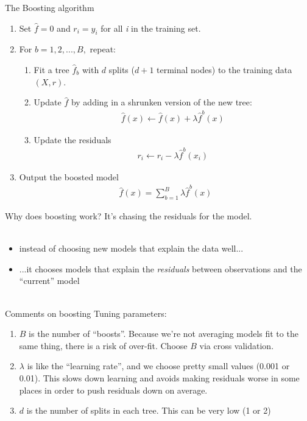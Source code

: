 \documentclass[mathserif, aspectratio=169]{beamer}
\begin{document}
\begin{frame}{The Boosting algorithm}
\begin{enumerate}
\item Set $\hat{f}=0$ and $r_i =y_i$ for all \textit{i} in the training set.
\item For $b=1,2,...,B,$ repeat:
\begin{enumerate}
\item Fit a tree $\hat{f}_b$ with $d$ splits ($d+1$ terminal nodes) to the training data $(X,r)$.
\item Update $\hat{f}$ by adding in a shrunken version of the new tree:
\begin{align*}
\hat{f}(x) \leftarrow\hat{f}(x)+\lambda \hat{f}^b(x)
\end{align*}
\item Update the residuals
\begin{align*}
r_i \leftarrow r_i - \lambda\hat{f}^b(x_i)
\end{align*}
\end{enumerate}
\item Output the boosted model
\begin{align*}
\hat{f}(x) =\sum_{b=1}^B \lambda \hat{f}^b(x)
\end{align*}
\end{enumerate}
\end{frame}

\begin{frame}{Why does boosting work?}
\pause
It's chasing the residuals for the model.\\~\\
\begin{itemize}
\item instead of choosing new models that explain the data well...
\item ...it chooses models that explain the \textit{residuals} between observations and the ``current'' model\\~\\
\end{itemize}
\end{frame}

\begin{frame}{Comments on boosting}
Tuning parameters:
\begin{enumerate}
\item $B$ is the number of ``boosts''.  Because we're not averaging models fit to the same thing, there is a risk of over-fit.  Choose $B$ via cross validation.
\item $\lambda$ is like the ``learning rate'', and we choose pretty small values (0.001 or 0.01).   This slows down learning and avoids making residuals worse in some places in order to push residuals down on average. 
\item $d$ is the number of splits in each tree.  This can be very low (1 or 2)
\end{enumerate}
\end{frame}
\end{document}
